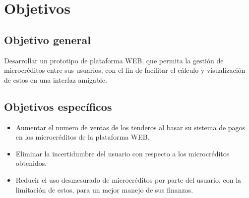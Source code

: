 \section{Objetivos}
	\subsection{Objetivo general}
	
	{Desarrollar un prototipo de plataforma WEB, que permita la gestión de microcréditos entre sus usuarios, con el fin de facilitar el cálculo y visualización de estos en una interfaz amigable.}
	
	\subsection{Objetivos específicos}
	
	\begin{itemize}
		\item Aumentar el numero de ventas de los tenderos al basar su sistema de pagos en los microcréditos de la plataforma WEB.
		\item Eliminar la incertidumbre del usuario con respecto a los microcréditos obtenidos.
		\item Reducir el uso desmesurado de microcréditos por parte del usuario, con la limitación de estos, para un mejor manejo de sus finanzas.
	\end{itemize}
	
	
	
	
	
	